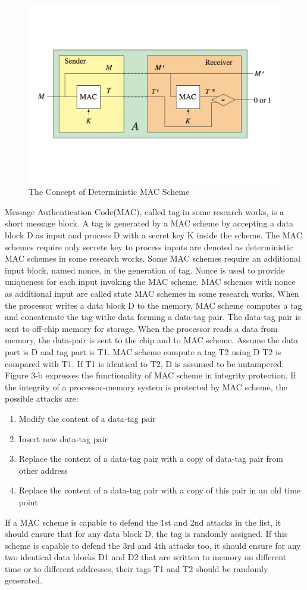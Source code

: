 \documentclass{article}
\begin{document}
\begin{figure}[htbp]
\centering
\includegraphics[scale=0.4]{./diagrams/MAC.pdf}
\caption{The Concept of Deterministic MAC Scheme}
\label{deterministic_mac }
\end{figure}
Message Authentication Code(MAC), called tag in some research works, is a short message block. A tag is generated by a MAC scheme by accepting a data block D as input and process D with a secret key K inside the scheme. The MAC schemes require only secrete key to process inputs are denoted as deterministic MAC schemes in some research works.
Some MAC schemes require an additional input block, named nonce, in the generation of tag. Nonce is used to provide uniqueness for each input invoking the MAC scheme. MAC schemes with nonce as additional input are called state MAC schemes in some research works.
When the processor writes a data block D to the memory, MAC scheme computes a tag  and concatenate the tag withe data forming a data-tag pair. The data-tag pair is sent to off-chip memory for storage.
When the processor reads a data from memory, the data-pair is sent to the chip and to MAC scheme. Assume the data part is D and tag part is T1. MAC scheme compute a tag T2 using D T2 is compared with T1. If T1 is identical to T2, D is assumed to be untampered.
 Figure 3-b expresses the functionality of MAC scheme in integrity protection.
If the integrity of a processor-memory system is protected by MAC scheme, the possible attacks are:
\begin{enumerate}
	\item Modify the content of a data-tag pair
	\item Insert new data-tag pair
	\item Replace the content of a data-tag pair with a copy of data-tag pair from other address
	\item Replace the content of a data-tag pair with a copy of this pair in an old time point
\end{enumerate}
If a MAC scheme is capable to defend the 1st and 2nd attacks in the list, it should ensure that for any data block D, the tag is randomly assigned. If this scheme is capable to defend the 3rd and 4th attacks too, it should ensure for any two identical data blocks D1 and D2 that are written to memory on different time or to different addresses, their tags T1 and T2 should be randomly generated.
\end{document}
